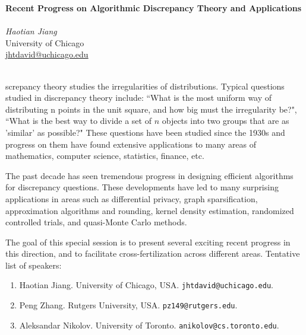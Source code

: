 \documentclass[12pt,a4paper,figuresright]{book}
\newcommand{\organizer}[3]{%
	{\textit{#1}}\\\nopagebreak%
	#2\\\nopagebreak%
	\url{#3}\vspace{3mm}\\\nopagebreak%
	}
\newenvironment{session}[5] %
 {%
  \vskip 0pt\nopagebreak%
  \textbf{#1}\vspace{3mm}\\\nopagebreak%
  \ifthenelse{\equal{#2}{1}}{Organizer:}{Organizers:}%
  \vspace{2mm}\\\nopagebreak%
  #3
  \ifthenelse{\equal{#2}{2}}{#4}{}%
  \ifthenelse{\equal{#2}{3}}{#4#5}{}%
  \quad\\\nopagebreak%
 }
 {\nopagebreak}%
\begin{document}
	
\begin{session}
  {Recent Progress on Algorithmic Discrepancy Theory and Applications}%
  {1} %
  {\organizer{Haotian Jiang}%
    {University of Chicago}%
    {jhtdavid@uchicago.edu}}%


Discrepancy theory studies the irregularities of distributions. Typical questions studied in discrepancy theory include: ``What is the most uniform way of distributing n points in the unit square, and how big must the irregularity be?", ``What is the best way to divide a set of $n$ objects into two groups that are as 'similar' as possible?" These questions have been studied since the 1930s and progress on them have found extensive applications to many areas of mathematics, computer science, statistics, finance, etc. 

The past decade has seen tremendous progress in designing efficient algorithms for discrepancy questions. These developments have led to many surprising applications in areas such as differential privacy, graph sparsification, approximation algorithms and rounding, kernel density estimation, randomized controlled trials, and quasi-Monte Carlo methods. 

The goal of this special session is to present several exciting recent progress in this direction, and to facilitate cross-fertilization across different areas. Tentative list of speakers:  
\begin{enumerate}
    \item Haotian Jiang. University of Chicago, USA. \texttt{jhtdavid@uchicago.edu}. 
    \item Peng Zhang. Rutgers University, USA. \texttt{pz149@rutgers.edu}. 
    \item Aleksandar Nikolov. University of Toronto. \texttt{anikolov@cs.toronto.edu}.
\end{enumerate}


\end{session}
\end{document}

